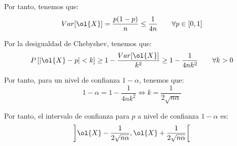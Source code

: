\begin{ejercicio}
    Por tanto, tenemos que:
    \begin{equation*}
        Var[\ol{X}] = \frac{p(1-p)}{n} \leq \frac{1}{4n} \qquad \forall p\in [0,1]
    \end{equation*}

    Por la desigualdad de Chebyshev, tenemos que:
    \begin{equation*}
        P\left[\left|\ol{X}-p\right|< k\right] \geq 1-\frac{Var[\ol{X}]}{k^2} \geq 1-\frac{1}{4nk^2}\qquad \forall k>0
    \end{equation*}

    Por tanto, para un nivel de confianza $1-\alpha$, tenemos que:
    \begin{equation*}
        1-\alpha = 1-\frac{1}{4nk^2} \iff k = \frac{1}{2\sqrt{n\alpha}}
    \end{equation*}

    Por tanto, el intervalo de confianza para $p$ a nivel de confianza $1-\alpha$ es:
    \begin{equation*}
        \left]\ol{X}-\frac{1}{2\sqrt{n\alpha}},\ol{X}+\frac{1}{2\sqrt{n\alpha}}\right[
    \end{equation*}
\end{ejercicio}

